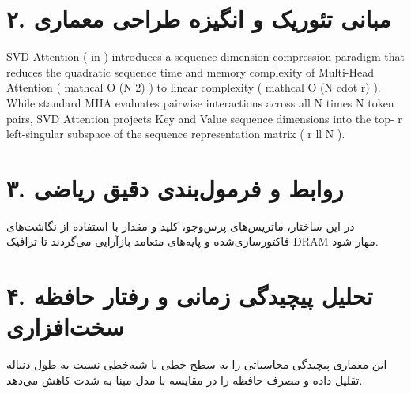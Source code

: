 \documentclass[12pt,a4paper]{article}
\begin{document}
\section*{۲. مبانی تئوریک و انگیزه طراحی معماری}
SVD Attention ( in ) introduces a sequence-dimension compression paradigm that reduces the quadratic sequence time and memory complexity of Multi-Head Attention ( mathcal O (N 2) ) to linear complexity ( mathcal O (N cdot r) ). While standard MHA evaluates pairwise interactions across all N times N token pairs, SVD Attention projects Key and Value sequence dimensions into the top- r left-singular subspace of the sequence representation matrix ( r ll N ).

\section*{۳. روابط و فرمول‌بندی دقیق ریاضی}
در این ساختار، ماتریس‌های پرس‌وجو، کلید و مقدار با استفاده از نگاشت‌های فاکتورسازی‌شده و پایه‌های متعامد بازآرایی می‌گردند تا ترافیک DRAM مهار شود.

\section*{۴. تحلیل پیچیدگی زمانی و رفتار حافظه سخت‌افزاری}
این معماری پیچیدگی محاسباتی را به سطح خطی یا شبه‌خطی نسبت به طول دنباله تقلیل داده و مصرف حافظه را در مقایسه با مدل مبنا به شدت کاهش می‌دهد.
\end{document}
